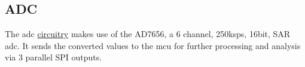 \subsection{ADC}

The \gls{adc} \hyperlink{sch:adc}{circuitry} makes use of the AD7656, a 6 channel, 250ksps, 16bit, SAR \gls{adc}. It sends the converted values to the \gls{mcu} for further processing and analysis via 3 parallel SPI outputs.

